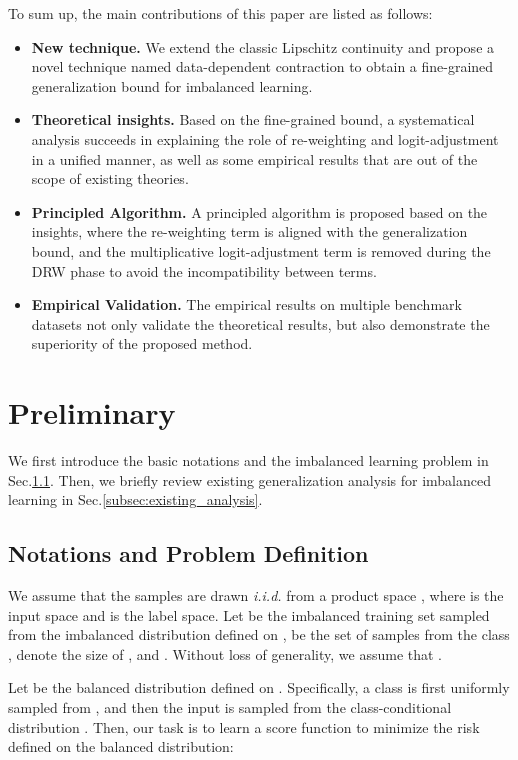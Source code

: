 To sum up, the main contributions of this paper are listed as follows:
\begin{itemize}[leftmargin=*]
    \item \textbf{New technique.} We extend the classic Lipschitz continuity and propose a novel technique named data-dependent contraction to obtain a fine-grained generalization bound for imbalanced learning.
    \item \textbf{Theoretical insights.} Based on the fine-grained bound, a systematical analysis succeeds in explaining the role of re-weighting and logit-adjustment in a unified manner, as well as some empirical results that are out of the scope of existing theories.
    \item \textbf{Principled Algorithm.} A principled algorithm is proposed based on the insights, where the re-weighting term is aligned with the generalization bound, and the multiplicative logit-adjustment term is removed during the DRW phase to avoid the incompatibility between terms.
    \item \textbf{Empirical Validation.} The empirical results on multiple benchmark datasets not only validate the theoretical results, but also demonstrate the superiority of the proposed method.
\end{itemize}

\section{Preliminary}
We first introduce the basic notations and the imbalanced learning problem in Sec.\ref{subsec:notation}. Then, we briefly review existing generalization analysis for imbalanced learning in Sec.\ref{subsec:existing_analysis}.
\subsection{Notations and Problem Definition}
\label{subsec:notation}
We assume that the samples are drawn \textit{i.i.d.} from a product space , where  is the input space and  is the label space. Let  be the imbalanced training set sampled from the imbalanced distribution  defined on ,  be the set of samples from the class ,  denote the size of ,  and . Without loss of generality, we assume that .

Let  be the balanced distribution defined on . Specifically, a class  is first uniformly sampled from , and then the input  is sampled from the class-conditional distribution . Then, our task is to learn a score function  to minimize the risk defined on the balanced distribution:

